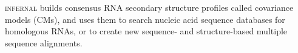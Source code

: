 \textsc{infernal} builds consensus RNA secondary structure profiles
called covariance models (CMs), and uses them to search nucleic acid
sequence databases for homologous RNAs, or to create new sequence- and
structure-based multiple sequence alignments.
